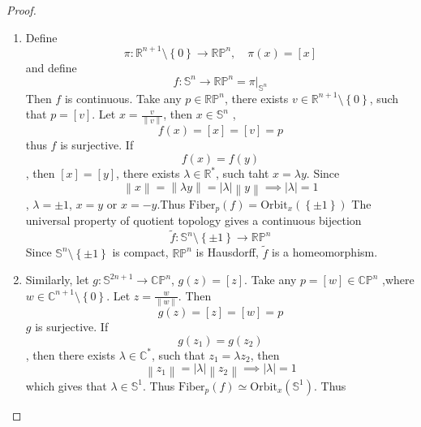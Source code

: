 \documentclass[../main.tex]{subfiles}
\begin{document}
\begin{proof}
    \begin{enumerate}
        \item Define \[
         \pi: \mathbb{R} ^{n+ 1}\setminus \left\{ 0 \right\}\to \mathbb{RP}^{n} ,\quad  \pi\left( x \right)= \left[ x \right]  
        \] and define \[
        f: \mathbb{S}^{n}\to \mathbb{RP}^{n}=   \left.  \pi \right|_{\mathbb{S}^{n}}
        \] Then \(  f  \) is continuous.  Take any \(  p \in \mathbb{RP}^{n}  \), there exists \(  v \in \mathbb{R} ^{n+ 1}\setminus \left\{ 0 \right\}  \), such that \(  p= \left[ v \right]   \).  Let \(  x = \frac{v }{\left\| v \right\| }   \), then \(  x \in \mathbb{S}^{n}  \)     , \[
        f\left( x \right)= \left[ x \right]= \left[ v \right]= p   
        \] thus \(  f  \) is surjective.  If \[
        f\left( x \right)= f\left( y \right)  
        \] , then \(  \left[ x \right]= \left[ y \right]    \), there exists \(   \lambda  \in \mathbb{R}^{*}  \), such taht \(  x=  \lambda y  \). Since \[
        \left\| x \right\|= \left\|  \lambda y \right\|= \left|  \lambda  \right|\left\| y \right\|\implies \left|  \lambda  \right|= 1  
        \], \(   \lambda = \pm 1  \), \(  x= y  \) or \(  x = -y  \).Thus \(  \mathrm{Fiber}_{p}\left( f \right)= \mathrm{Orbit}_{x}\left( \left\{ \pm 1 \right\} \right)    \)  The universal property of quotient topology  gives a continuous bijection \[
        \tilde{f}: \mathbb{S}^{n}\setminus \left\{ \pm 1 \right\}\to \mathbb{RP}^{n}
        \]    Since \(  \mathbb{S}^{n}\setminus \left\{ \pm 1 \right\}  \) is compact, \(  \mathbb{RP}^{n}  \) is Hausdorff,  \(  \tilde{f}  \) is a homeomorphism.    
        \item Similarly, let \(  g:\mathbb{S}^{2n+ 1}\to \mathbb{CP}^{n}  \), \(  g\left( z \right)= \left[ z \right]    \). Take any \(  p = \left[ w \right] \in \mathbb{CP}^{n}  \) ,where \(  w \in \mathbb{C}^{n+ 1}\setminus \left\{ 0 \right\}  \). Let \(  z = \frac{w }{\left\| w \right\| }   \). Then \[
        g\left( z \right)= \left[ z \right]= \left[ w \right]= p   
        \] \(  g  \) is surjective.      
        If \[
        g\left( z_1 \right)= g\left( z_2 \right)  
        \] , then there exists \(   \lambda  \in \mathbb{C}^{*}  \), such that \(  z_1=  \lambda z_2  \), then \[
        \left\| z_1 \right\|= \left|  \lambda  \right|\left\| z_2 \right\|\implies \left|  \lambda  \right|= 1  
        \] which gives that \(   \lambda \in \mathbb{S}^{1}  \). Thus \(  \mathrm{Fiber}_{p}\left( f \right)\simeq \mathrm{Orbit}_{x}\left( \mathbb{S}^{1} \right)    \).  Thus \[
\]
\end{enumerate}
\end{proof}
\end{document}
